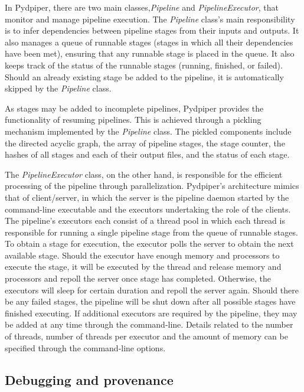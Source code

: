 \documentclass{report}
\begin{document}
        In Pydpiper, there are two main classes,\textit{Pipeline} and \textit{PipelineExecutor}, 
that monitor and manage pipeline execution. The \textit{Pipeline} class's main responsibility
is to infer dependencies between pipeline stages from their inputs and outputs. It also manages
a queue of runnable stages (stages in which all their dependencies have been met), ensuring
that any runnable stage is placed in the queue. It also keeps track of the status of the runnable
stages (running, finished, or failed). Should an already existing stage be added to the pipeline, it
is automatically skipped by the \textit{Pipeline} class. 

        As stages may be added to incomplete pipelines, Pydpiper provides the functionality of resuming
pipelines. This is achieved through a pickling mechanism implemented by the \textit{Pipeline} class. The
pickled components include the directed acyclic graph, the array of pipeline stages, the stage counter,
the hashes of all stages and each of their output files, and the status of each stage.

        The \textit{PipelineExecutor} class, on the other hand, is responsible for the efficient processing
of the pipeline through parallelization. Pydpiper's architecture mimics that of client/server, in which the 
server is the pipeline daemon started by the command-line executable and the executors undertaking the role of 
the clients. The pipeline's executors each consist of a thread pool in which each
thread is responsible for running a single pipeline stage from the queue of runnable stages. To
obtain a stage for execution, the executor polls the server to obtain the next available stage. Should
the executor have enough memory and processors to execute the stage, it will be executed by the thread
and release memory and processors and repoll the server once stage has completed.
Otherwise, the executors will sleep for certain duration and repoll the server again. 
Should there be any failed stages, the pipeline will be shut down after all possible stages have finished 
executing. If additional executors are required by the pipeline, they may be added at any time through
the command-line. Details related to
the number of threads, number of threads per executor and the amount of memory can be specified through the
command-line options. 

    
        \subsection{Debugging and provenance}
\end{document}
